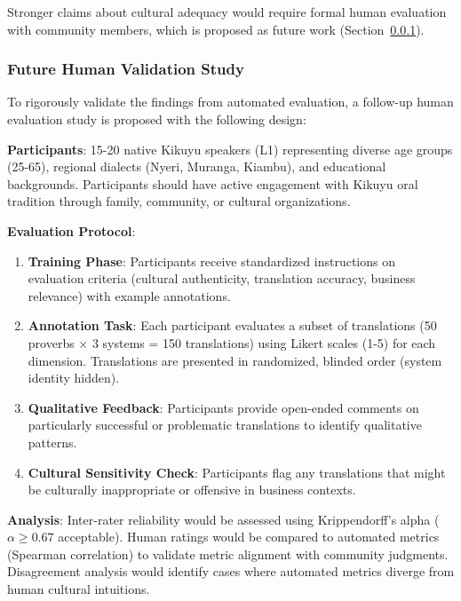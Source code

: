 Stronger claims about cultural adequacy would require formal human evaluation with community members, which is proposed as future work (Section~\ref{subsubsec:future_human_study}).

\subsubsection{Future Human Validation Study}
\label{subsubsec:future_human_study}

To rigorously validate the findings from automated evaluation, a follow-up human evaluation study is proposed with the following design:

\textbf{Participants}: 15-20 native Kikuyu speakers (L1) representing diverse age groups (25-65), regional dialects (Nyeri, Muranga, Kiambu), and educational backgrounds. Participants should have active engagement with Kikuyu oral tradition through family, community, or cultural organizations.

\textbf{Evaluation Protocol}:
\begin{enumerate}
    \item \textbf{Training Phase}: Participants receive standardized instructions on evaluation criteria (cultural authenticity, translation accuracy, business relevance) with example annotations.
    
    \item \textbf{Annotation Task}: Each participant evaluates a subset of translations (50 proverbs × 3 systems = 150 translations) using Likert scales (1-5) for each dimension. Translations are presented in randomized, blinded order (system identity hidden).
    
    \item \textbf{Qualitative Feedback}: Participants provide open-ended comments on particularly successful or problematic translations to identify qualitative patterns.
    
    \item \textbf{Cultural Sensitivity Check}: Participants flag any translations that might be culturally inappropriate or offensive in business contexts.
\end{enumerate}

\textbf{Analysis}: Inter-rater reliability would be assessed using Krippendorff's alpha ($\alpha \geq 0.67$ acceptable). Human ratings would be compared to automated metrics (Spearman correlation) to validate metric alignment with community judgments. Disagreement analysis would identify cases where automated metrics diverge from human cultural intuitions.

